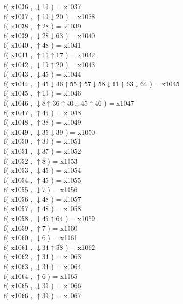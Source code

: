 f( x1036 , $\downarrow$19 ) = x1037 \\
f( x1037 , $\uparrow$19$\downarrow$20 ) = x1038 \\
f( x1038 , $\uparrow$28 ) = x1039 \\
f( x1039 , $\downarrow$28$\downarrow$63 ) = x1040 \\
f( x1040 , $\uparrow$48 ) = x1041 \\
f( x1041 , $\uparrow$16$\uparrow$17 ) = x1042 \\
f( x1042 , $\downarrow$19$\uparrow$20 ) = x1043 \\
f( x1043 , $\downarrow$45 ) = x1044 \\
f( x1044 , $\uparrow$45$\downarrow$46$\uparrow$55$\uparrow$57$\downarrow$58$\downarrow$61$\uparrow$63$\downarrow$64 ) = x1045 \\
f( x1045 , $\uparrow$19 ) = x1046 \\
f( x1046 , $\downarrow$8$\uparrow$36$\uparrow$40$\downarrow$45$\uparrow$46 ) = x1047 \\
f( x1047 , $\uparrow$45 ) = x1048 \\
f( x1048 , $\uparrow$38 ) = x1049 \\
f( x1049 , $\downarrow$35$\downarrow$39 ) = x1050 \\
f( x1050 , $\uparrow$39 ) = x1051 \\
f( x1051 , $\downarrow$37 ) = x1052 \\
f( x1052 , $\uparrow$8 ) = x1053 \\
f( x1053 , $\downarrow$45 ) = x1054 \\
f( x1054 , $\uparrow$45 ) = x1055 \\
f( x1055 , $\downarrow$7 ) = x1056 \\
f( x1056 , $\downarrow$48 ) = x1057 \\
f( x1057 , $\uparrow$48 ) = x1058 \\
f( x1058 , $\downarrow$45$\uparrow$64 ) = x1059 \\
f( x1059 , $\uparrow$7 ) = x1060 \\
f( x1060 , $\downarrow$6 ) = x1061 \\
f( x1061 , $\downarrow$34$\uparrow$58 ) = x1062 \\
f( x1062 , $\uparrow$34 ) = x1063 \\
f( x1063 , $\downarrow$34 ) = x1064 \\
f( x1064 , $\uparrow$6 ) = x1065 \\
f( x1065 , $\downarrow$39 ) = x1066 \\
f( x1066 , $\uparrow$39 ) = x1067 \\
